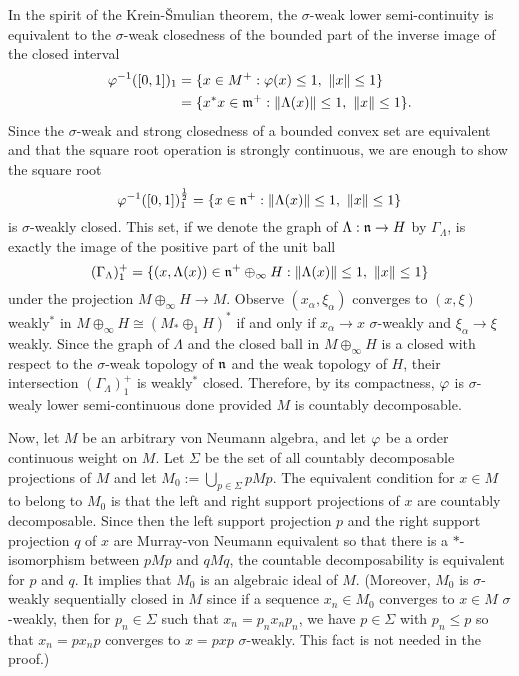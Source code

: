 \documentclass{../../small}
\begin{document}
\begin{pf}
In the spirit of the Krein-\v Smulian theorem, the $\sigma$-weak lower semi-continuity is equivalent to the $\sigma$-weak closedness of the bounded part of the inverse image of the closed interval
\begin{align*}
\varphi^{-1}([0,1])_1
&=\{x\in M^+:\varphi(x)\le1,\ \|x\|\le1\}\\
&=\{x^*x\in\mathfrak{m}^+:\|\Lambda(x)\|\le1,\ \|x\|\le1\}.
\end{align*}
Since the $\sigma$-weak and strong closedness of a bounded convex set are equivalent and that the square root operation is strongly continuous, we are enough to show the square root
\[\f^{-1}([0,1])_1^{\frac12}=\{x\in\fn^+:\|\Lambda(x)\|\le1,\ \|x\|\le1\}\]
is $\sigma$-weakly closed.
This set, if we denote the graph of $\Lambda:\mathfrak{n}\to H$ by $\Gamma_\Lambda$, is exactly the image of the positive part of the unit ball
\[(\Gamma_\Lambda)^+_1=\{(x,\Lambda(x))\in\mathfrak{n}^+\oplus_\infty H:\|\Lambda(x)\|\le1,\ \|x\|\le1\}\]
under the projection $M\oplus_\infty H\to M$.
Observe $(x_\alpha,\xi_\alpha)$ converges to $(x,\xi)$ weakly$^*$ in $M\oplus_\infty H\cong(M_*\oplus_1H)^*$ if and only if $x_\alpha\to x$ $\sigma$-weakly and $\xi_\alpha\to\xi$ weakly.
Since the graph of $\Lambda$ and the closed ball in $M\oplus_\infty H$ is a closed with respect to the $\sigma$-weak topology of $\mathfrak{n}$ and the weak topology of $H$, their intersection $(\Gamma_\Lambda)_1^+$ is weakly$^*$ closed.
Therefore, by its compactness, $\varphi$ is $\sigma$-wealy lower semi-continuous done provided $M$ is countably decomposable.


Now, let $M$ be an arbitrary von Neumann algebra, and let $\varphi$ be a order continuous weight on $M$.
Let $\Sigma$ be the set of all countably decomposable projections of $M$ and let $M_0:=\bigcup_{p\in\Sigma}pMp$.
The equivalent condition for $x\in M$ to belong to $M_0$ is that the left and right support projections of $x$ are countably decomposable.
Since then the left support projection $p$ and the right support projection $q$ of $x$ are Murray-von Neumann equivalent so that there is a $*$-isomorphism between $pMp$ and $qMq$, the countable decomposability is equivalent for $p$ and $q$.
It implies that $M_0$ is an algebraic ideal of $M$.
(Moreover, $M_0$ is $\sigma$-weakly sequentially closed in $M$ since if a sequence $x_n\in M_0$ converges to $x\in M$ $\sigma$-weakly, then for $p_n\in\Sigma$ such that $x_n=p_nx_np_n$, we have $p\in\Sigma$ with $p_n\le p$ so that $x_n=px_np$ converges to $x=pxp$ $\sigma$-weakly.
This fact is not needed in the proof.)


\end{pf}
\end{document}
